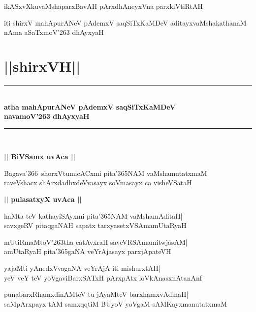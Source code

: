 \documentclass[twoside,12pt,openright]{book}
\newcounter{shloka}[chapter]
\def\uvaca#1{\centerline{{\large\textbf{#1}}}}
\begin{document}
\begin{shloka}%
ikASxvXkuvaMshaparxBavAH pArxdhAneyxVna parxkiVtiRtAH
\end{shloka}

\begin{center}
iti shirxV mahApurANeV pAdemxV saqSiTxKaMDeV
 aditayxvaMshakathanaM nAma aSaTxmoV\char'263 dhAyxyaH
\end{center}

\chapter{||shirxVH||}
\begin{center}
\rule{2cm}{1pt}\\[0.5cm]
{\LARGE\bfseries atha mahApurANeV pAdemxV saqSiTxKaMDeV}\\[.3cm]
{\LARGE\bfseries navamoV\char'263 dhAyxyaH}\\[.3cm]
\rule{2cm}{1pt}\\
\end{center}

\uvaca{|| BiVSamx uvAca ||}
\begin{shloka}%
Bagava\char'366\ shorxVtumicACxmi pita\char'365NAM vaMshamutatxmaM|\\
raveVshacx shArxdadhxdeVvasayx soVmasayx ca visheVSataH
\end{shloka}

\uvaca{|| pulasatxyX uvAca ||}
\begin{shloka}%
haMta teV kathayiSAyxmi pita\char'365NAM vaMshamAditaH|\\
savxgeRV pitaqgaNAH sapatx tarxyasetxVSAmamUtaRyaH
\end{shloka}

\begin{shloka}%
mUtiRmaMtoV\char'263tha catAvxraH saveVRSAmamitwjasAM|\\
amUtaRyaH pita\char'365gaNA veYrAjasayx parxjApateVH
\end{shloka}

\begin{shloka}%
yajaMti yAnedxVvagaNA veYrAjA iti mishurxtAH|\\
yeV veY teV yoVgaviBarxSATxH pArxpAtx loVkAnasxnAtanAnf
\end{shloka}

\begin{shloka}%
punabarxRhamxdinAMteV tu jAyaMteV barxhamxvAdinaH|\\
saMpArxpayx tAM samxqqtiM BUyoV yoVgaM sAMKayxmanutatxmaM 
\end{shloka}
\end{document}
